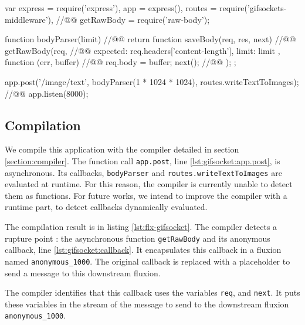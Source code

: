 \begin{code}[js, caption={Simplified version of gifsockets-server},label={lst:gifsocket}]
var express = require('express'),
    app = express(),
    routes = require('gifsockets-middleware'), //@\label{lst:gifsocket:gif-mw}@
    getRawBody = require('raw-body');

function bodyParser(limit) { //@\label{lst:gifsocket:bodyParser}@
  return function saveBody(req, res, next) { //@\label{lst:gifsocket:saveBody}@
    getRawBody(req, { //@\label{lst:gifsocket:getRawBody}@
      expected: req.headers['content-length'],
      limit: limit
    }, function (err, buffer) { //@\label{lst:gifsocket:callback}@
      req.body = buffer;
      next(); //@\label{lst:gifsocket:next}@
    });
  };
}

app.post('/image/text', bodyParser(1 * 1024 * 1024), routes.writeTextToImages); //@\label{lst:gifsocket:app.post}@
app.listen(8000);
\end{code}


\subsection{Compilation}

We compile this application with the compiler detailed in section \ref{section:compiler}.
The function call \texttt{app.post}, line \ref{lst:gifsocket:app.post}, is asynchronous.
Its callbacks, \texttt{bodyParser} and \texttt{routes.writeTextToImages} are evaluated at runtime.
For this reason, the compiler is currently unable to detect them as functions.
For future works, we intend to improve the compiler with a runtime part, to detect callbacks dynamically evaluated.

The compilation result is in listing \ref{lst:flx-gifsocket}.
The compiler detects a rupture point : the asynchronous function \texttt{getRawBody} and its anonymous callback, line \ref{lst:gifsocket:callback}.
It encapsulates this callback in a fluxion named \texttt{anonymous\-\_1000}.
The original callback is replaced with a placeholder to send a message to this downstream fluxion.

The compiler identifies that this callback uses the variables \texttt{req}, and \texttt{next}.
It puts these variables in the stream of the message to send to the downstream fluxion \texttt{anonymous\-\_1000}.


